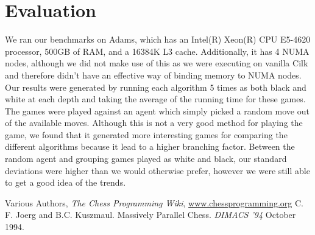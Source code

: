 \documentclass[]{article}
\begin{document}
\section{Evaluation}
We ran our benchmarks on Adams, which has an Intel(R) Xeon(R) CPU E5-4620 processor, 500GB of RAM, and a 16384K L3 cache.  Additionally, it has 4 NUMA nodes, although we did not make use of this as we were executing on vanilla Cilk and therefore didn't have an effective way of binding memory to NUMA nodes.  Our results were generated by running each algorithm 5 times as both black and white at each depth and taking the average of the running time for these games.  The games were played against an agent which simply picked a random move out of the available moves.  Although this is not a very good method for playing the game, we found that it generated more interesting games for comparing the different algorithms because it lead to a higher branching factor.  Between the random agent and grouping games played as white and black, our standard deviations were higher than we would otherwise prefer, however we were still able to get a good idea of the trends.
\begin{thebibliography}{9}
  Various Authors,
  \textit{The Chess Programming Wiki},
  \url{www.chessprogramming.org}
  C. F. Joerg and B.C. Kuszmaul.
  Massively Parallel Chess.
  \textit{DIMACS '94}
  October 1994.
\end{thebibliography}
\end{document}
